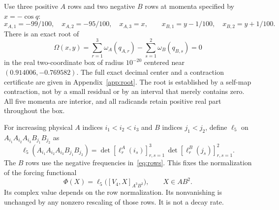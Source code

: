 \documentclass[11pt,a4paper]{article}
\begin{document}
Use three positive $A$ rows and two negative $B$ rows at momenta specified
by $x=-\cos q$:
\begin{equation}
 x_{A,1}=-99/100,\quad x_{A,2}=-95/100,\quad x_{A,3}=x,
 \qquad x_{B,1}=y-1/100,\quad x_{B,2}=y+1/100.\label{eq:momenta}
\end{equation}
There is an exact root of
\begin{equation}
 \Omega(x,y)=\sum_{r=1}^3\omega_A(q_{A,r})
                    -\sum_{s=1}^2\omega_B(q_{B,s})=0\label{eq:resonance}
\end{equation}
in the real two-coordinate box of radius $10^{-20}$ centered near
$(0.914006,-0.769582)$.
The full exact decimal center and a contraction certificate are given in
Appendix~\ref{app:root}. The root is established by a self-map contraction,
not by a small residual or by an interval that merely contains zero.
All five momenta are interior, and all radicands retain positive real part
throughout the box.

For increasing physical $A$ indices $i_1<i_2<i_3$ and $B$ indices $j_1<j_2$,
define $\ell_5$ on $A_{i_1}A_{i_2}A_{i_3}B_{j_1}B_{j_2}$ as
\begin{equation}
 \ell_5(A_{i_1}A_{i_2}A_{i_3}B_{j_1}B_{j_2})
 =\det[\ell^A_r(i_s)]_{r,s=1}^3\,
  \det[\ell^B_r(j_s)]_{r,s=1}^2.\label{eq:ell5}
\end{equation}
The $B$ rows use the negative frequencies in~\eqref{eq:rows}.
This fixes the normalization of the forcing functional
\begin{equation}
 \Phi(X)=\ell_5\bigl([V_4,X]_{A^3B^2}\bigr),\qquad X\in AB^2.
 \label{eq:phi}
\end{equation}
Its complex value depends on the row normalization. Its nonvanishing is
unchanged by any nonzero rescaling of those rows. It is not a decay rate.
\end{document}
